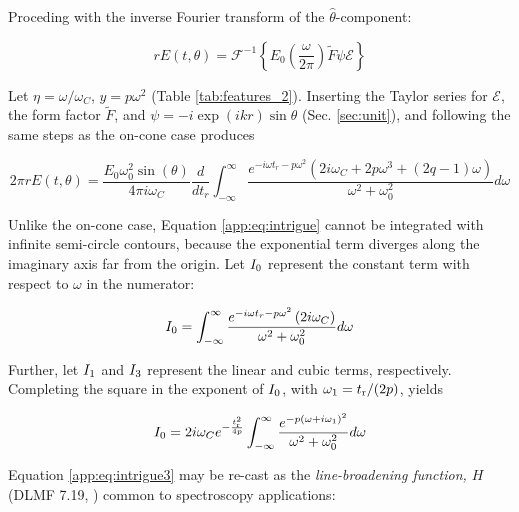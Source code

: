 \documentclass[amsmath,amssymb,aps,prd,10pt,twocolumn]{revtex4}
\begin{document}
Proceding with the inverse Fourier transform of the $\hat{\theta}$-component:

\begin{equation}
r E(t,\theta) = \mathcal{F}^{-1} \left\lbrace E_0 \left(\frac{\omega}{2\pi}\right) \widetilde{F} \psi \mathcal{E} \right\rbrace
\end{equation}

Let $\eta = \omega/\omega_C$, $y = p \omega^2$ (Table \ref{tab:features_2}).  Inserting the Taylor series for $\mathcal{E}$, the form factor $\widetilde{F}$, and $\psi = -i \exp(ikr) \sin\theta$ (Sec. \ref{sec:unit}), and following the same steps as the on-cone case produces

\begin{widetext}
\begin{equation}
2\pi r E(t,\theta) = \frac{E_0 \omega_0^2 \sin(\theta)}{4 \pi i \omega_C} \frac{d}{dt_{r}} \int_{-\infty}^{\infty} \frac{e^{-i \omega t_r - p\omega^2}  \left( 2 i \omega_C + 2 p \omega^3 + (2 q - 1) \omega \right)}{\omega^2+\omega_0^2}d\omega \label{app:eq:intrigue}
\end{equation}
\end{widetext}

Unlike the on-cone case, Equation \ref{app:eq:intrigue} cannot be integrated with infinite semi-circle contours, because the exponential term diverges along the imaginary axis far from the origin.  Let $I_{\rm 0}$ represent the constant term with respect to $\omega$ in the numerator:

\begin{equation}
I_{\rm 0} = \int_{-\infty}^{\infty} \frac{e^{-i \omega t_r - p\omega^2}  \left( 2 i \omega_C \right)}{\omega^2+\omega_0^2}d\omega \label{app:eq:intrigue2}
\end{equation}

Further, let $I_{\rm 1}$ and $I_{\rm 3}$ represent the linear and cubic terms, respectively.  Completing the square in the exponent of $I_{\rm 0}$, with $\omega_{\rm 1} = t_{\rm r}/(2p)$, yields

\begin{equation}
I_{\rm 0} = 2 i \omega_C e^{- \frac{t_{\rm r}^2}{4p}} \int_{-\infty}^{\infty} \frac{e^{-p(\omega + i\omega_{\rm 1})^2}}{\omega^2+\omega_0^2}d\omega \label{app:eq:intrigue3}
\end{equation}

Equation \ref{app:eq:intrigue3} may be re-cast as the \textit{line-broadening function, $H$} (DLMF 7.19, \cite{NIST:DLMF}) common to spectroscopy applications:
\end{document}
